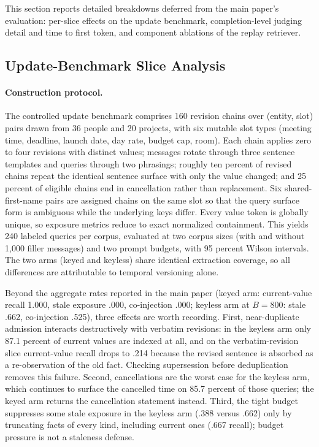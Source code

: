 \documentclass[letterpaper]{article} %
\begin{document}
This section reports detailed breakdowns deferred from the main paper's evaluation: per-slice effects on the update benchmark, completion-level judging detail and time to first token, and component ablations of the replay retriever.

\subsection{Update-Benchmark Slice Analysis}

\paragraph{Construction protocol.} The controlled update benchmark comprises 160 revision chains over (entity, slot) pairs drawn from 36 people and 20 projects, with six mutable slot types (meeting time, deadline, launch date, day rate, budget cap, room). Each chain applies zero to four revisions with distinct values; messages rotate through three sentence templates and queries through two phrasings; roughly ten percent of revised chains repeat the identical sentence surface with only the value changed; and 25 percent of eligible chains end in cancellation rather than replacement. Six shared-first-name pairs are assigned chains on the same slot so that the query surface form is ambiguous while the underlying keys differ. Every value token is globally unique, so exposure metrics reduce to exact normalized containment. This yields 240 labeled queries per corpus, evaluated at two corpus sizes (with and without 1{,}000 filler messages) and two prompt budgets, with 95 percent Wilson intervals. The two arms (keyed and keyless) share identical extraction coverage, so all differences are attributable to temporal versioning alone.

Beyond the aggregate rates reported in the main paper (keyed arm: current-value recall 1.000, stale exposure .000, co-injection .000; keyless arm at $B{=}800$: stale .662, co-injection .525), three effects are worth recording. First, near-duplicate admission interacts destructively with verbatim revisions: in the keyless arm only 87.1 percent of current values are indexed at all, and on the verbatim-revision slice current-value recall drops to .214 because the revised sentence is absorbed as a re-observation of the old fact. Checking supersession before deduplication removes this failure. Second, cancellations are the worst case for the keyless arm, which continues to surface the cancelled time on 85.7 percent of those queries; the keyed arm returns the cancellation statement instead. Third, the tight budget suppresses some stale exposure in the keyless arm (.388 versus .662) only by truncating facts of every kind, including current ones (.667 recall); budget pressure is not a staleness defense.
\end{document}
